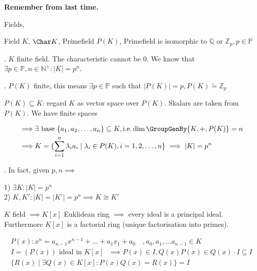 

\textbf{Remember from last time.}

Fields,

Field $K$, $\Char K$, Primefield $P(K)$, Primefield is isomorphic to $\mathbb{Q}$ or $\mathbb{Z}_p, p \in \mathbb{P}$

\Corollary.
$K$ finite field. The characteristic cannot be $0$. We know that $\exists p \in \mathbb{P}, n \in \mathbb{N}^{+}: |K| = p^n$. 

\Proof.
$P(K)$ finite, this means $\exists p \in \mathbb{P}$ such that $|P(K)| = p, P(K) \tilde{=} \mathbb{Z}_p$

$P(K) \subseteq K$: regard $K$ as vector space over $P(K)$. Skalars are taken from $P(K)$. We have finite spaces

\begin{align*}
  \implies & \exists \text{ base } \{ a_1, a_2, \ldots, a_n \} \subseteq K, \text{i.e.} \dim \GroupGenBy{K, + , P(K)} = n\\
  \implies & K= \{\sum_{i=1}^n \lambda_i a_i \mid \lambda_i \in P(K), i = 1,2,\ldots,n\} \implies |K| = p^n
\end{align*}

\Remark.
In fact, given $p,n \implies $

1) $\exists K: |K| = p^n$\\
2) $K, K': |K| = |K'| = p^n \implies K \cong K'$

$K$ field $\implies K[x]$ Euklidean ring $\implies$ every ideal is a principal ideal. Furthermore $K[x]$ is a factorial ring (unique factorisation into primes). 

\begin{align*}
  P(x): x^n = a_{n-1} x^{n-1} + \ldots + a_1 x_1 + a_0 \quad ,a_0, a_1, \ldots a_{n-1} \in K \\
  I = (P(x)) \text{ ideal in $K[x]$ } \implies P(x) \in I, Q(x)P(x) \in Q(x) \cdot I \subseteq I \\
  \{R(x) \mid \exists Q(x) \in K[x] : P(x)Q(x) = R(x)\} = I
\end{align*}

